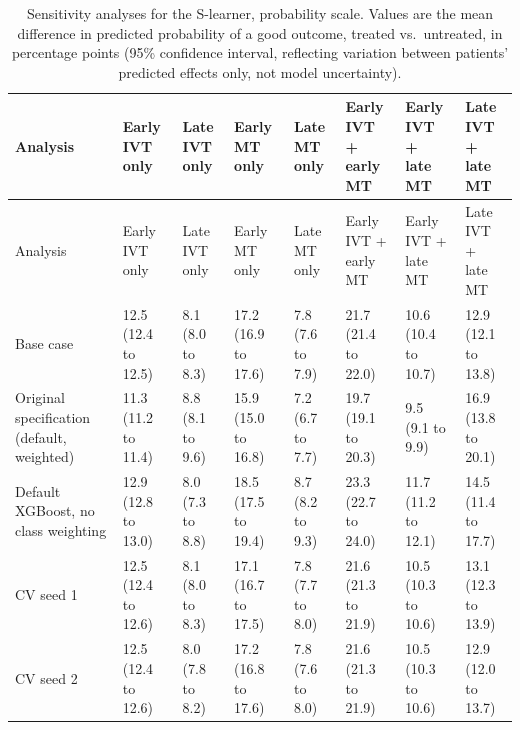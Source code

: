 \begin{landscape}
{
\scriptsize
\begin{longtable}[]{@{}llllllll@{}}
\caption{Sensitivity analyses for the S-learner, probability scale. Values are the mean difference in predicted probability of a good outcome, treated vs.\ untreated, in percentage points (95\% confidence interval, reflecting variation between patients' predicted effects only, not model uncertainty).}
\label{tab:sens_sl_prob}\\
\toprule
Analysis & \makecell[l]{Early IVT\\only} & \makecell[l]{Late IVT\\only} & \makecell[l]{Early MT\\only} & \makecell[l]{Late MT\\only} & \makecell[l]{Early IVT +\\early MT} & \makecell[l]{Early IVT +\\late MT} & \makecell[l]{Late IVT +\\late MT} \\
\midrule
\endfirsthead
\toprule
Analysis & \makecell[l]{Early IVT\\only} & \makecell[l]{Late IVT\\only} & \makecell[l]{Early MT\\only} & \makecell[l]{Late MT\\only} & \makecell[l]{Early IVT +\\early MT} & \makecell[l]{Early IVT +\\late MT} & \makecell[l]{Late IVT +\\late MT} \\
\midrule
\endhead
\bottomrule
\endlastfoot
Base case & 12.5 (12.4 to 12.5) & 8.1 (8.0 to 8.3) & 17.2 (16.9 to 17.6) & 7.8 (7.6 to 7.9) & 21.7 (21.4 to 22.0) & 10.6 (10.4 to 10.7) & 12.9 (12.1 to 13.8) \\
Original specification (default, weighted) & 11.3 (11.2 to 11.4) & 8.8 (8.1 to 9.6) & 15.9 (15.0 to 16.8) & 7.2 (6.7 to 7.7) & 19.7 (19.1 to 20.3) & 9.5 (9.1 to 9.9) & 16.9 (13.8 to 20.1) \\
Default XGBoost, no class weighting & 12.9 (12.8 to 13.0) & 8.0 (7.3 to 8.8) & 18.5 (17.5 to 19.4) & 8.7 (8.2 to 9.3) & 23.3 (22.7 to 24.0) & 11.7 (11.2 to 12.1) & 14.5 (11.4 to 17.7) \\
CV seed 1 & 12.5 (12.4 to 12.6) & 8.1 (8.0 to 8.3) & 17.1 (16.7 to 17.5) & 7.8 (7.7 to 8.0) & 21.6 (21.3 to 21.9) & 10.5 (10.3 to 10.6) & 13.1 (12.3 to 13.9) \\
CV seed 2 & 12.5 (12.4 to 12.6) & 8.0 (7.8 to 8.2) & 17.2 (16.8 to 17.6) & 7.8 (7.6 to 8.0) & 21.6 (21.3 to 21.9) & 10.5 (10.3 to 10.6) & 12.9 (12.0 to 13.7) \\

\end{longtable}}
\end{landscape}
